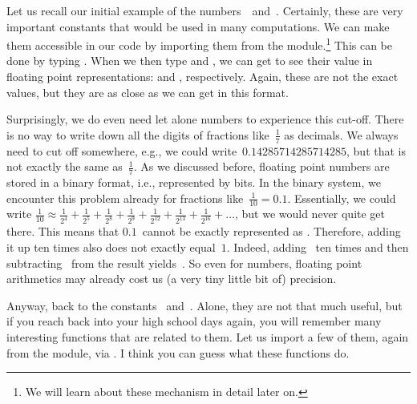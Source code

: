 %
Let us recall our initial example of the  numbers~\numberPi\ and~\numberE.
Certainly, these are very important constants that would be used in many computations.
We can make them accessible in our code by importing them from the  module.\footnote{%
We will learn about these mechanism in detail later on.}
This can be done by typing .
When we then type  and , we can get to see their value in floating point representations:  and , respectively.
Again, these are not the exact values, but they are as close as we can get in this format.

Surprisingly, we do even need  let alone  numbers to experience this cut-off.
There is no way to write down all the digits of fractions like~$\frac{1}{7}$ as decimals.
We always need to cut off somewhere, e.g., we could write~$0.14285714285714285$, but that is not exactly the same as~$\frac{1}{7}$.
As we discussed before, floating point numbers are stored in a binary format, i.e., represented by bits.
In the binary system, we encounter this problem already for fractions like~$\frac{1}{10}=0.1$.
Essentially, we could write $\frac{1}{10}\approx\frac{1}{2^4}+\frac{1}{2^5}+\frac{1}{2^8}+\frac{1}{2^9}+\frac{1}{2^{12}}+\frac{1}{2^{13}}+\frac{1}{2^{16}}+\dots$, but we would never quite get there.
This means that $0.1$~cannot be exactly represented as .
Therefore, adding it up ten times also does not exactly equal~$1$.
Indeed, adding~ ten times and then subtracting~ from the result yields~.
So even for  numbers, floating point arithmetics may already cost us (a very tiny little bit of) precision.

Anyway, back to the constants \numberPi\ and~\numberE.
Alone, they are not that much useful, but if you reach back into your high school days again, you will remember many interesting functions that are related to them.
Let us import a few of them, again from the  module, via .
I think you can guess what these functions do.

